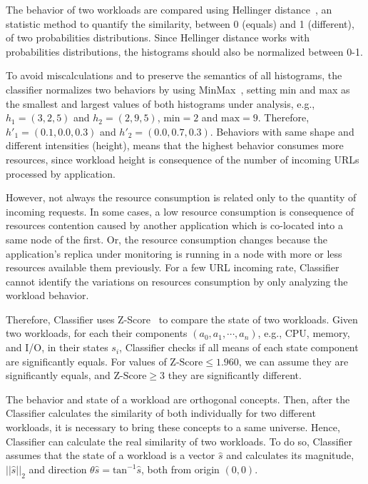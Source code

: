 The behavior of two workloads are compared using Hellinger distance~\cite{?}, an
statistic method to quantify the similarity, between 0 (equals) and 1
(different), of two probabilities distributions. Since Hellinger distance works
with probabilities distributions, the histograms should also be normalized
between 0-1.

To avoid miscalculations and to preserve the semantics of all histograms, the
classifier normalizes two behaviors by using MinMax~\cite{?}, setting min and
max as the smallest and largest values of both histograms under analysis, e.g.,
$h_1 = (3, 2, 5)$ and $h_2 = (2, 9, 5)$, $\text{min} = 2$ and $\text{max} = 9$.
Therefore, $h'_1 = (0.1, 0.0, 0.3)$ and $h'_2 = (0.0, 0.7, 0.3)$. Behaviors with
same shape and different intensities (height), means that the highest behavior
consumes more resources, since workload height is consequence of the number of
incoming URLs processed by application.

However, not always the resource consumption is related only to the quantity of
incoming requests. In some cases, a low resource consumption is consequence of
resources contention caused by another application which is co-located into a
same node of the first. Or, the resource consumption changes because the
application's replica under monitoring is running in a node with more or less
resources available them previously. For a few URL incoming rate, Classifier
cannot identify the variations on resources consumption by only analyzing the
workload behavior.

Therefore, Classifier uses Z-Score~\cite{?} to compare the state of two
workloads.  Given two workloads, for each their components $(a_0, a_1, \cdots,
a_n)$, e.g., CPU, memory, and I/O, in their states $s_i$, Classifier checks if
all means of each state component are significantly equals. For values of
$\text{Z-Score} \leq 1.960$, we can assume they are significantly equals, and
$\text{Z-Score} \geq 3$ they are significantly different.

The behavior and state of a workload are orthogonal concepts. Then, after the
Classifier calculates the similarity of both individually for two different
workloads,  it is necessary to bring these concepts to a same universe. Hence,
Classifier can calculate the real similarity of two workloads.  To do so,
Classifier assumes that the state of a workload is a vector $\hat{s}$ and
calculates its magnitude, $||\hat{s}||_2$ and direction $\theta \hat{s} =
\text{tan}^{-1} \hat{s}$, both from origin $(0,0)$.

